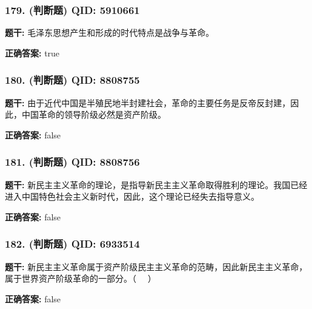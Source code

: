 \documentclass[12pt,UTF8]{ctexart}
\begin{document}
\vspace{0.3em}\hrulefill\vspace{0.7em}

\subsubsection*{179. (判断题) \small QID: 5910661}

\textbf{题干:}
毛泽东思想产生和形成的时代特点是战争与革命。

\textbf{正确答案:}
true

\vspace{0.3em}\hrulefill\vspace{0.7em}

\subsubsection*{180. (判断题) \small QID: 8808755}

\textbf{题干:}
由于近代中国是半殖民地半封建社会，革命的主要任务是反帝反封建，因此，中国革命的领导阶级必然是资产阶级。

\textbf{正确答案:}
false

\vspace{0.3em}\hrulefill\vspace{0.7em}

\subsubsection*{181. (判断题) \small QID: 8808756}

\textbf{题干:}
新民主主义革命的理论，是指导新民主主义革命取得胜利的理论。我国已经进入中国特色社会主义新时代，因此，这个理论已经失去指导意义。

\textbf{正确答案:}
false

\vspace{0.3em}\hrulefill\vspace{0.7em}

\subsubsection*{182. (判断题) \small QID: 6933514}

\textbf{题干:}
新民主主义革命属于资产阶级民主主义革命的范畴，因此新民主主义革命，属于世界资产阶级革命的一部分。（   ）

\textbf{正确答案:}
false

\vspace{0.3em}\hrulefill\vspace{0.7em}
\end{document}
